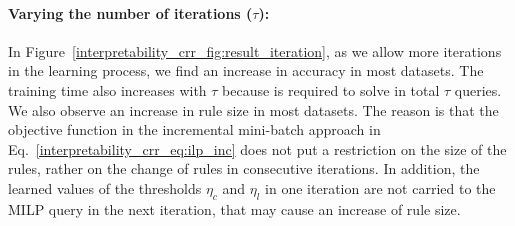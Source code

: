 	\paragraph{Varying the number of iterations ($ \tau $):}   
	In Figure~\ref{interpretability_crr_fig:result_iteration}, as we allow more iterations in the learning process, we find an increase in accuracy in most datasets. The training time also increases with $ \tau $ because {\crr} is required to solve in total $ \tau $ queries. We also observe an increase in rule size in most datasets. The reason is that the objective function in the incremental mini-batch approach in Eq.~\ref{interpretability_crr_eq:ilp_inc} does not put a restriction on the size of the rules, rather on the change of rules in consecutive iterations.  In addition, the learned values of the thresholds $ \eta_c$ and $ \eta_l $  in one iteration are not carried to the MILP query in the next iteration, that may cause an increase of rule size. 
	

	



	
	
